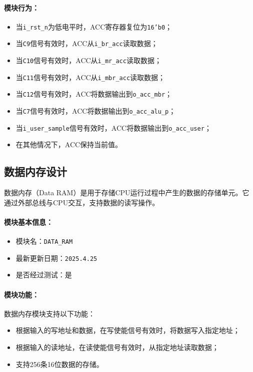 \documentclass[lang=cn,a4paper,newtx]{elegantpaper}
\begin{document}
\paragraph{模块行为：}
\begin{itemize}
  \item 当\texttt{i\_rst\_n}为低电平时，ACC寄存器复位为\texttt{16'b0}；
  \item 当\texttt{C9}信号有效时，ACC从\texttt{i\_br\_acc}读取数据；
  \item 当\texttt{C10}信号有效时，ACC从\texttt{i\_mr\_acc}读取数据；
  \item 当\texttt{C11}信号有效时，ACC从\texttt{i\_mbr\_acc}读取数据；
  \item 当\texttt{C12}信号有效时，ACC将数据输出到\texttt{o\_acc\_mbr}；
  \item 当\texttt{C7}信号有效时，ACC将数据输出到\texttt{o\_acc\_alu\_p}；
  \item 当\texttt{i\_user\_sample}信号有效时，ACC将数据输出到\texttt{o\_acc\_user}；
  \item 在其他情况下，ACC保持当前值。
\end{itemize}

\subsection{数据内存设计}
数据内存（Data RAM）是用于存储CPU运行过程中产生的数据的存储单元。它通过外部总线与CPU交互，支持数据的读写操作。

\paragraph{模块基本信息：}
\begin{itemize}
  \item 模块名：\texttt{DATA\_RAM}
  \item 最新更新日期：\texttt{2025.4.25}
  \item 是否经过测试：是
\end{itemize}

\paragraph{模块功能：}
数据内存模块支持以下功能：
\begin{itemize}
  \item 根据输入的写地址和数据，在写使能信号有效时，将数据写入指定地址；
  \item 根据输入的读地址，在读使能信号有效时，从指定地址读取数据；
  \item 支持256条16位数据的存储。
\end{itemize}
\end{document}
